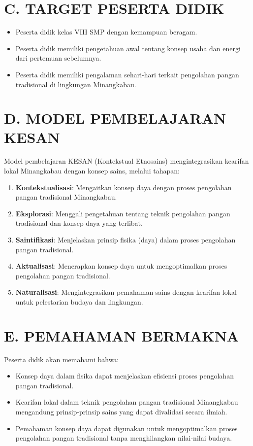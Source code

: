 \documentclass[12pt,a4paper]{article}
\begin{document}
\section*{C. TARGET PESERTA DIDIK}
\begin{itemize}[leftmargin=*]
    \item Peserta didik kelas VIII SMP dengan kemampuan beragam.
    \item Peserta didik memiliki pengetahuan awal tentang konsep usaha dan energi dari pertemuan sebelumnya.
    \item Peserta didik memiliki pengalaman sehari-hari terkait pengolahan pangan tradisional di lingkungan Minangkabau.
\end{itemize}

\section*{D. MODEL PEMBELAJARAN KESAN}
\begin{tcolorbox}[colback=white,colframe=black,title=Model KESAN (Kontekstual Etnosains),boxrule=1pt]
Model pembelajaran KESAN (Kontekstual Etnosains) mengintegrasikan kearifan lokal Minangkabau dengan konsep sains, melalui tahapan:
\begin{enumerate}[leftmargin=*]
    \item \textbf{Kontekstualisasi}: Mengaitkan konsep daya dengan proses pengolahan pangan tradisional Minangkabau.
    \item \textbf{Eksplorasi}: Menggali pengetahuan tentang teknik pengolahan pangan tradisional dan konsep daya yang terlibat.
    \item \textbf{Saintifikasi}: Menjelaskan prinsip fisika (daya) dalam proses pengolahan pangan tradisional.
    \item \textbf{Aktualisasi}: Menerapkan konsep daya untuk mengoptimalkan proses pengolahan pangan tradisional.
    \item \textbf{Naturalisasi}: Mengintegrasikan pemahaman sains dengan kearifan lokal untuk pelestarian budaya dan lingkungan.
\end{enumerate}
\end{tcolorbox}

\section*{E. PEMAHAMAN BERMAKNA}
\begin{tcolorbox}[colback=white,colframe=black,boxrule=1pt]
Peserta didik akan memahami bahwa:
\begin{itemize}[leftmargin=*]
    \item Konsep daya dalam fisika dapat menjelaskan efisiensi proses pengolahan pangan tradisional.
    \item Kearifan lokal dalam teknik pengolahan pangan tradisional Minangkabau mengandung prinsip-prinsip sains yang dapat divalidasi secara ilmiah.
    \item Pemahaman konsep daya dapat digunakan untuk mengoptimalkan proses pengolahan pangan tradisional tanpa menghilangkan nilai-nilai budaya.
\end{itemize}
\end{tcolorbox}
\end{document}
